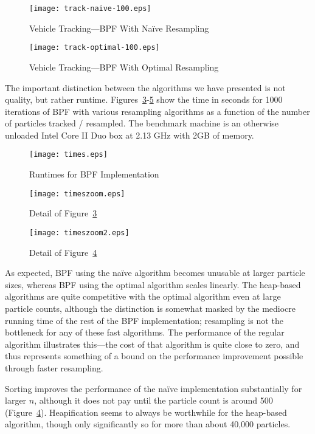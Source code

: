 \documentclass[12pt]{article}
\begin{document}
  \begin{figure}
    \centering
    \texttt{[image: track-naive-100.eps]}
    \caption{Vehicle Tracking---BPF With Na\"ive Resampling}\label{fig-track-naive}
  \end{figure}

  \begin{figure}
    \centering
    \texttt{[image: track-optimal-100.eps]}
    \caption{Vehicle Tracking---BPF With Optimal Resampling}\label{fig-track-optimal}
  \end{figure}

  The important distinction between the algorithms we have
  presented is not
  quality, but rather runtime.
  Figures~\ref{fig-times}-\ref{fig-timeszoom2} show the time
  in seconds for 1000 iterations of BPF with various
  resampling algorithms as a function of the number of
  particles tracked / resampled.  The benchmark machine is
  an otherwise unloaded Intel Core II Duo box at 2.13 GHz
  with 2GB of memory.

  \begin{figure}
    \centering
    \texttt{[image: times.eps]}
    \caption{Runtimes for BPF Implementation}\label{fig-times}
  \end{figure}

  \begin{figure}
    \centering
    \texttt{[image: timeszoom.eps]}
    \caption{Detail of Figure~\ref{fig-times}}\label{fig-timeszoom}
  \end{figure}

  \begin{figure}
    \centering
    \texttt{[image: timeszoom2.eps]}
    \caption{Detail of Figure~\ref{fig-timeszoom}}\label{fig-timeszoom2}
  \end{figure}

  As expected, BPF using the na\"ive
  algorithm becomes unusable at larger particle sizes,
  whereas BPF using the optimal algorithm scales linearly.
  The heap-based algorithms are quite competitive with the
  optimal algorithm even at large particle counts, although
  the distinction is somewhat masked by the mediocre running
  time of the rest of the BPF implementation; resampling is
  not the bottleneck for any of these fast algorithms.  The
  performance of the regular algorithm illustrates
  this---the cost of that algorithm is quite close to zero,
  and thus represents something of a bound on the
  performance improvement possible through faster resampling.

  Sorting improves the performance of the na\"ive
  implementation substantially for larger $n$, although it
  does not pay until the particle count is around 500
  (Figure~\ref{fig-timeszoom}).  Heapification seems to
  always be worthwhile for the heap-based algorithm, though
  only significantly so for more than about 40,000
  particles.
\end{document}
